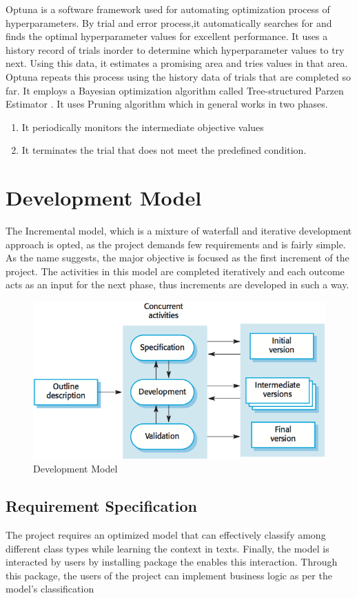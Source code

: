Optuna \cite{optuna_2019} is a software framework used for automating optimization process of hyperparameters. By trial and error process,it automatically searches for and finds the optimal hyperparameter values for excellent performance.
It uses a history record of trials inorder to determine which hyperparameter values to try next. Using this data, it estimates a promising area and tries values in that area. Optuna repeats this process using the history data of trials that are completed so far. It employs a Bayesian optimization algorithm called Tree-structured Parzen Estimator \cite{tree_structured}.
It uses Pruning algorithm which in general works in two phases.
\begin{enumerate}
\item It periodically monitors the intermediate objective values
\item It terminates the trial that does not meet the predefined condition.
\end{enumerate}


\section{Development Model}
The Incremental model, which is a mixture of waterfall and iterative development approach is opted, as the project demands few requirements and is fairly simple. As the name suggests, the major objective is focused as the first increment of the project. The activities in this model are completed iteratively and each outcome acts as an input for the next phase, thus increments are developed in such a way.
\begin{figure}[h]
	\centering
	\includegraphics[scale=1.3]{images/incremental.png}
	\caption{Development Model}
\end{figure}
\subsection{Requirement Specification}
The project requires an optimized model that can effectively classify among different class types while learning the context in texts. Finally, the model is interacted by users by installing package the enables this interaction. Through this package, the users of the project can implement business logic as per the model's classification
